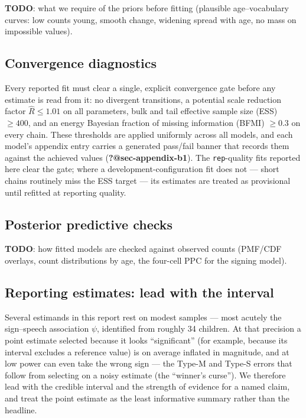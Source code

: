 \documentclass[
  11pt,
  a4paper,
]{report}
\begin{document}
\textbf{TODO}: what we require of the priors before fitting (plausible
age--vocabulary curves: low counts young, smooth change, widening spread
with age, no mass on impossible values).

\subsection{Convergence diagnostics}\label{convergence-diagnostics}

Every reported fit must clear a single, explicit convergence gate before
any estimate is read from it: no divergent transitions, a potential
scale reduction factor \(\hat{R} \le 1.01\) on all parameters, bulk and
tail effective sample size (ESS) \(\ge 400\), and an energy Bayesian
fraction of missing information (BFMI) \(\ge 0.3\) on every chain. These
thresholds are applied uniformly across all models, and each model's
appendix entry carries a generated pass/fail banner that records them
against the achieved values (\textbf{?@sec-appendix-b1}). The
\texttt{rep}-quality fits reported here clear the gate; where a
development-configuration fit does not --- short chains routinely miss
the ESS target --- its estimates are treated as provisional until
refitted at reporting quality.

\subsection{Posterior predictive
checks}\label{posterior-predictive-checks}

\textbf{TODO}: how fitted models are checked against observed counts
(PMF/CDF overlays, count distributions by age, the four-cell PPC for the
signing model).

\subsection{Reporting estimates: lead with the
interval}\label{reporting-estimates-lead-with-the-interval}

Several estimands in this report rest on modest samples --- most acutely
the sign--speech association \(\psi\), identified from roughly 34
children. At that precision a point estimate selected because it looks
``significant'' (for example, because its interval excludes a reference
value) is on average inflated in magnitude, and at low power can even
take the wrong sign --- the Type-M and Type-S errors that follow from
selecting on a noisy estimate (the ``winner's curse''). We therefore
lead with the credible interval and the strength of evidence for a named
claim, and treat the point estimate as the least informative summary
rather than the headline.
\end{document}
